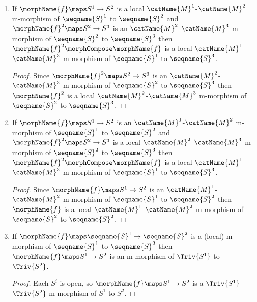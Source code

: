\documentclass{article}
\begin{document}
\begin{corollary}
\begin{enumerate}
\item
If $\morphName{f} \maps S^1 \to S^2$ is a local
$\catName{M}^1$-$\catName{M}^2$ m-morphism of $\seqname{S}^1$ to
$\seqname{S}^2$ and $\morphName{f}^2 \maps S^2 \to S^3$ is an
$\catName{M}^2$-$\catName{M}^3$ m-morphism of $\seqname{S}^2$ to
$\seqname{S}^3$ then $\morphName{f}^2 \morphCompose \morphName{f}$ is a local
$\catName{M}^1$-$\catName{M}^3$ m-morphism of $\seqname{S}^1$ to
$\seqname{S}^3$.

\begin{proof}
Since $\morphName{f}^2 \maps S^2 \to S^3$ is an
$\catName{M}^2$-$\catName{M}^3$ m-morphism of $\seqname{S}^2$ to
$\seqname{S}^3$ then $\morphName{f}^2$ is a local
$\catName{M}^2$-$\catName{M}^3$ m-morphism of $\seqname{S}^2$ to
$\seqname{S}^3$.
\end{proof}

\item
If $\morphName{f} \maps S^1 \to S^2$ is an
$\catName{M}^1$-$\catName{M}^2$ m-morphism of $\seqname{S}^1$ to
$\seqname{S}^2$ and $\morphName{f}^2 \maps S^2 \to S^3$ is a local
$\catName{M}^2$-$\catName{M}^3$ m-morphism of $\seqname{S}^2$ to
$\seqname{S}^3$ then $\morphName{f}^2 \morphCompose \morphName{f}$ is a local
$\catName{M}^1$-$\catName{M}^3$ m-morphism of $\seqname{S}^1$ to
$\seqname{S}^3$.

\begin{proof}
Since $\morphName{f} \maps S^1 \to S^2$ is an
$\catName{M}^1$-$\catName{M}^2$ m-morphism of $\seqname{S}^1$ to
$\seqname{S}^2$ then $\morphName{f}$ is a local
$\catName{M}^1$-$\catName{M}^2$ m-morphism of $\seqname{S}^2$ to
$\seqname{S}^2$.
\end{proof}

\item
\label{M-morph:morphistrivmorph}
If $\morphName{f} \maps \seqname{S}^1 \to \seqname{S}^2$ is a (local)
m-morphism of $\seqname{S}^1$ to $\seqname{S}^2$ then
$\morphName{f} \maps S^1 \to S^2$ is an m-morphism of $\Triv{S^1}$ to
$\Triv{S^2}$.

\begin{proof}
Each $S^i$ is open, so $\morphName{f} \maps S^1 \to S^2$ is a
$\Triv{S^1}$-$\Triv{S^2}$ m-morphism of $S^1$ to $S^2$.
\end{proof}
\end{enumerate}
\end{corollary}
\end{document}
